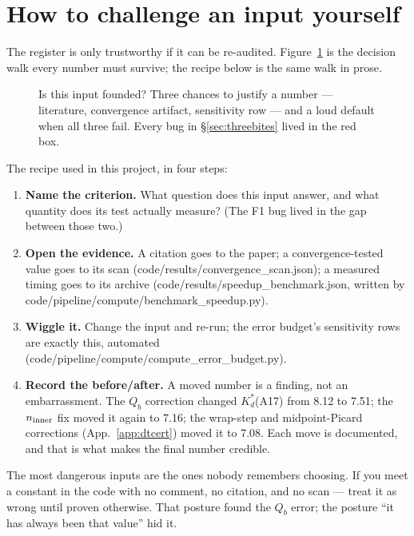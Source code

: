 \documentclass[11pt]{report}
\newcommand{\code}[1]{{\ttfamily\small #1}}
\begin{document}
\section{How to challenge an input yourself}\label{sec:challenge}

The register is only trustworthy if it can be re-audited.
Figure~\ref{fig:inputflow} is the decision walk every number must survive;
the recipe below is the same walk in prose.

\begin{figure}[htbp]\centering

\caption{Is this input founded? Three chances to justify a number ---
literature, convergence artifact, sensitivity row --- and a loud default when
all three fail. Every bug in \S\ref{sec:threebites} lived in the red box.}
\label{fig:inputflow}
\end{figure}

The recipe used in this project, in four steps:

\begin{enumerate}[leftmargin=1.6em,itemsep=2pt]
\item \textbf{Name the criterion.} What question does this input answer, and
  what quantity does its test actually measure? (The F1 bug lived in the gap
  between those two.)
\item \textbf{Open the evidence.} A citation goes to the paper; a
  convergence-tested value goes to its scan
  (\code{code/results/convergence\_scan.json}); a measured timing goes to its
  archive (\code{code/results/speedup\_benchmark.json}, written by
  \code{code/pipeline/compute/benchmark\_speedup.py}).
\item \textbf{Wiggle it.} Change the input and re-run; the error budget's
  sensitivity rows are exactly this, automated
  (\code{code/pipeline/compute/compute\_error\_budget.py}).
\item \textbf{Record the before/after.} A moved number is a finding, not an
  embarrassment. The $Q_b$ correction changed $K_d^{*}$(A17) from 8.12 to 7.51;
  the $n_{\rm inner}$ fix moved it again to 7.16; the wrap-step and
  midpoint-Picard corrections (App.~\ref{app:dtcert}) moved it to 7.08. Each
  move is documented, and
  that is what makes the final number credible.
\end{enumerate}

\begin{warn}
The most dangerous inputs are the ones nobody remembers choosing. If you meet
a constant in the code with no comment, no citation, and no scan --- treat it
as wrong until proven otherwise. That posture found the $Q_b$ error; the
posture ``it has always been that value'' hid it.
\end{warn}
\end{document}
